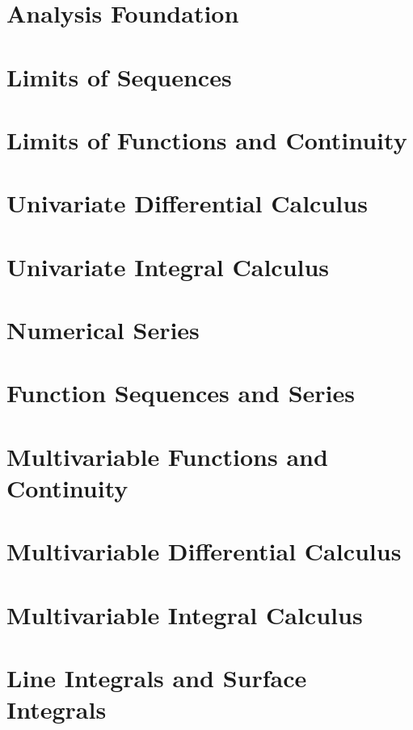 \documentclass{report}
\begin{document}
	
	\thispagestyle{empty}
	\newpage%
	\tableofcontents
  

  \chapter{Analysis Foundation}
  
  \chapter{Limits of Sequences}
  
  \chapter{Limits of Functions and Continuity}
  
  \chapter{Univariate Differential Calculus}
  
  \chapter{Univariate Integral Calculus}
  
  \chapter{Numerical Series}
  
  \chapter{Function Sequences and Series}
  
  \chapter{Multivariable Functions and Continuity}
  
  \chapter{Multivariable Differential Calculus}
  
  \chapter{Multivariable Integral Calculus}
  
  \chapter{Line Integrals and Surface Integrals}
  



  
\end{document}
